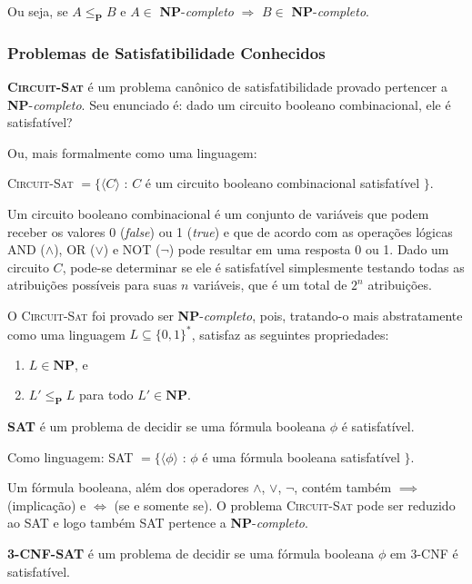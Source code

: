 Ou seja, se $A \leq_{\textbf{P}} B$ e $A \in$ \textbf{NP}-\textit{completo} $\Rightarrow$ $B \in$ \textbf{NP}-\textit{completo}.

\subsubsection{Problemas de Satisfatibilidade Conhecidos}

\textbf{\textsc{Circuit-Sat}} é um problema canônico de satisfatibilidade provado pertencer a \textbf{NP}-\textit{completo}. Seu enunciado é: dado um circuito booleano combinacional, ele é satisfatível?

Ou, mais formalmente como uma linguagem:
	
\textsc{Circuit-Sat} $ = \{ \langle C \rangle$ : $C$ é um circuito booleano combinacional satisfatível $\}$.

Um circuito booleano combinacional é um conjunto de variáveis que podem receber os valores 0 (\textit{false}) ou 1 (\textit{true}) e que de acordo com as operações lógicas AND ($\land$), OR ($\lor$) e NOT ($\lnot$) pode resultar em uma resposta 0 ou 1. Dado um circuito $C$, pode-se determinar se ele é satisfatível simplesmente testando todas as atribuições possíveis para suas $n$ variáveis, que é um total de $2^n$ atribuições.

O \textsc{Circuit-Sat} foi provado ser \textbf{NP}-\textit{completo}, pois, tratando-o mais abstratamente como uma linguagem $L \subseteq \{0,1\}^*$, satisfaz as seguintes propriedades:
\begin{enumerate}[itemindent=1cm]
	\item $L \in \textbf{NP}$, e 
	\item $L' \leq_{\textbf{P}} L$ para todo $L' \in \mathbf{NP}$.
\end{enumerate}

\textbf{\textsc{SAT}} é um problema de decidir se uma fórmula booleana $\phi$ é satisfatível.

Como linguagem:
\textsc{SAT} $= \{ \langle \phi \rangle$ : $\phi$ é uma fórmula booleana satisfatível $\}.$
	
Um fórmula booleana, além dos operadores $\land$, $\lor$, $\lnot$, contém também $\implies$ (implicação) e $\iff$ (se e somente se). O problema \textsc{Circuit-Sat} pode ser reduzido ao \textsc{SAT} e logo também \textsc{SAT} pertence a \textbf{NP}-\textit{completo}.

\textbf{\textsc{3-CNF-SAT}} é um problema de decidir se uma fórmula booleana $\phi$ em 3-CNF é satisfatível.

